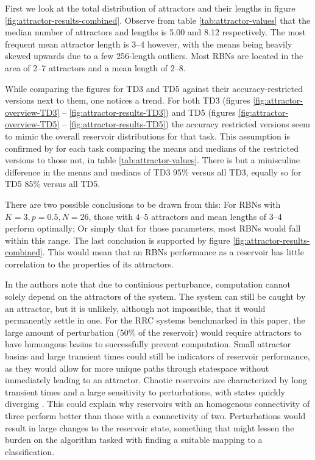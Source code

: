 First we look at the total distribution of attractors and their lengths in figure \ref{fig:attractor-results-combined}.
Observe from table \ref{tab:attractor-values} that the median number of attractors and lengths is 5.00 and 8.12 respectively.
The most frequent mean attractor length is 3--4 however,
with the means being heavily skewed upwards due to a few 256-length outliers.
Most RBNs are located in the area of 2--7 attractors and a mean length of 2--8.

While comparing the figures for TD3 and TD5 against their accuracy-restricted versions next to them,
one notices a trend.
For both TD3 (figures \ref{fig:attractor-overview-TD3} -- \ref{fig:attractor-results-TD3}) and TD5 (figures \ref{fig:attractor-overview-TD5} -- \ref{fig:attractor-results-TD5})
the accuracy restricted versions seem to mimic the overall reservoir distributions for that task.
This assumption is confirmed by for each task comparing the means and medians of the restricted versions to those not,
in table \ref{tab:attractor-values}.
There is but a minisculine difference in the means and medians of TD3 95\% versus all TD3,
equally so for TD5 85\% versus all TD5.

There are two possible conclusions to be drawn from this:
For RBNs with $ K=3, p=0.5, N=26 $,
those with 4--5 attractors and mean lengths of 3--4 perform optimally;
Or simply that for those parameters, most RBNs would fall within this range.
The last conclusion is supported by figure \ref{fig:attractor-results-combined}.
This would mean that an RBNs performance as a reservoir has little correlation to the properties of its attractors.

In \cite{rbn-reservoir} the authors note that due to continious perturbance,
computation cannot solely depend on the attractors of the system.
The system can still be caught by an attractor,
but it is unlikely,
although not impossible,
that it would permanently settle in one.
For the RRC systems benchmarked in this paper,
the large amount of perturbation (50\% of the reservoir) would require attractors to have humongous basins to successfully prevent computation.
Small attractor basins and large transient times could still be indicators of reservoir performance,
as they would allow for more unique paths through statespace without immediately leading to an attractor.
Chaotic reservoirs are characterized by long transient times and a large sensitivity to perturbations,
with states quickly diverging \cite{gershenson2004introduction}.
This could explain why reservoirs with an homogenous connectivity of three perform better than those with a connectivity of two.
Perturbations would result in large changes to the reservoir state,
something that might lessen the burden on the algorithm tasked with finding a suitable mapping to a classification.
